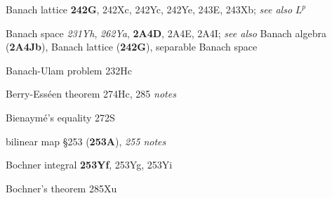 Banach lattice {\bf 242G}, 242Xc, 242Yc, 242Ye, 243E, 243Xb;  
  {\it see also}
$L^p$






Banach space {\it 231Yh}, {\it 262Ya},
{\bf 2A4D}, 2A4E, 2A4I;  
  {\it see also} Banach algebra ({\bf 2A4Jb}), Banach lattice ({\bf 242G}), separable Banach space


Banach-Ulam problem 232Hc












































Berry-Ess\'een theorem 274Hc, 285 {\it notes}












Bienaym\'e's equality 272S




bilinear map \S253 ({\bf 253A}), {\it 255 notes}












Bochner integral {\bf 253Yf}, 253Yg, 253Yi


Bochner's theorem 285Xu































